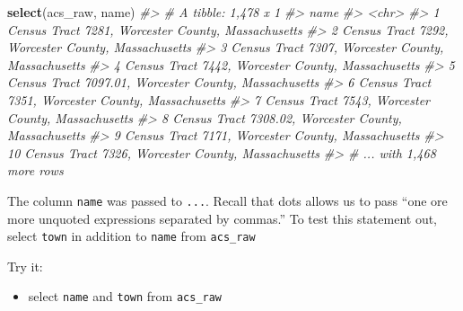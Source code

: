 \documentclass[
]{book}
\newenvironment{Shaded}{\begin{snugshade}}{\end{snugshade}}
\newcommand{\CommentTok}[1]{\textcolor[rgb]{0.56,0.35,0.01}{\textit{#1}}}
\newcommand{\KeywordTok}[1]{\textcolor[rgb]{0.13,0.29,0.53}{\textbf{#1}}}
\newcommand{\NormalTok}[1]{#1}
\providecommand{\tightlist}{%
  \setlength{\itemsep}{0pt}\setlength{\parskip}{0pt}}
\begin{document}
\begin{Shaded}
\begin{Highlighting}[]
\KeywordTok{select}\NormalTok{(acs\_raw, name)}
\CommentTok{\#\textgreater{} \# A tibble: 1,478 x 1}
\CommentTok{\#\textgreater{}    name                                                 }
\CommentTok{\#\textgreater{}    \textless{}chr\textgreater{}                                                }
\CommentTok{\#\textgreater{}  1 Census Tract 7281, Worcester County, Massachusetts   }
\CommentTok{\#\textgreater{}  2 Census Tract 7292, Worcester County, Massachusetts   }
\CommentTok{\#\textgreater{}  3 Census Tract 7307, Worcester County, Massachusetts   }
\CommentTok{\#\textgreater{}  4 Census Tract 7442, Worcester County, Massachusetts   }
\CommentTok{\#\textgreater{}  5 Census Tract 7097.01, Worcester County, Massachusetts}
\CommentTok{\#\textgreater{}  6 Census Tract 7351, Worcester County, Massachusetts   }
\CommentTok{\#\textgreater{}  7 Census Tract 7543, Worcester County, Massachusetts   }
\CommentTok{\#\textgreater{}  8 Census Tract 7308.02, Worcester County, Massachusetts}
\CommentTok{\#\textgreater{}  9 Census Tract 7171, Worcester County, Massachusetts   }
\CommentTok{\#\textgreater{} 10 Census Tract 7326, Worcester County, Massachusetts   }
\CommentTok{\#\textgreater{} \# ... with 1,468 more rows}
\end{Highlighting}
\end{Shaded}

The column \texttt{name} was passed to \texttt{...}. Recall that dots allows us to pass ``one ore more unquoted expressions separated by commas.'' To test this statement out, select \texttt{town} in addition to \texttt{name} from \texttt{acs\_raw}

Try it:

\begin{itemize}
\tightlist
\item
  select \texttt{name} and \texttt{town} from \texttt{acs\_raw}
\end{itemize}
\end{document}
